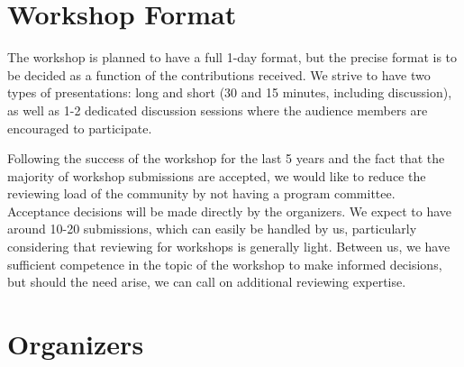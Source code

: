 \documentclass[10pt]{article}
\begin{document}
\section*{Workshop Format}

The workshop is planned to have a full 1-day format, but the precise
format is to be decided as a function of the contributions received.
We strive to have two types of presentations: long and short (30 and
15 minutes, including discussion), as well as 1-2 dedicated discussion
sessions where the audience members are encouraged to participate.

Following the success of the workshop for the last 5 years and the fact
that the majority of workshop submissions are accepted, we would like to reduce 
the reviewing load of the community by not having a program
committee. Acceptance decisions will be made directly by the
organizers. We expect to have around 10-20 submissions, which can
easily be handled by us, particularly considering that reviewing for
workshops is generally light. Between us, we have sufficient
competence in the topic of the workshop to make informed decisions,
but should the need arise, we can call on additional reviewing
expertise.

\section*{Organizers}
\end{document}
